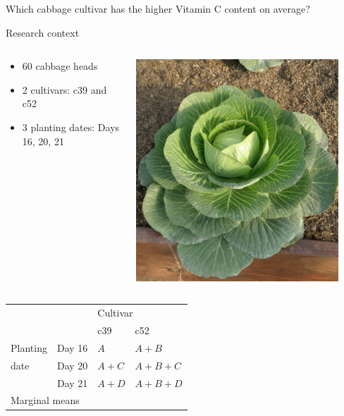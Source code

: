 \documentclass[10pt]{beamer}
\begin{document}
\begin{frame}{Which cabbage cultivar has the higher Vitamin C content on average?}
 \begin{block}{Research context}
 \begin{columns}
  \begin{column}{0.8\textwidth}
   \begin{itemize}
    \item 60 cabbage heads
    \item 2 cultivars: c39 and c52
    \item 3 planting dates: Days 16, 20, 21
   \end{itemize}
  \end{column}
  \begin{column}{0.2\textwidth}
    \includegraphics[width=0.9\textwidth]{Figures/cabbage}
  \end{column}

 \end{columns}
 \end{block}

 
 \pause
 
 \begin{center}
\begin{tabular}{|l | l | l | l | }
\toprule
  \multicolumn{2}{|l|}{} & \multicolumn{2}{l|}{Cultivar}\\
  \cmidrule(lr){3-4}
  \multicolumn{2}{|l|}{}  & c39 & c52\\
 	    \midrule
      Planting& Day 16 & $A$ & $A+B$\\
 	 date   & Day 20 & $A+C$ & $A+B+C$\\
		& Day 21 & $A+D$ & $A+B+D$\\
		\midrule
\multicolumn{2}{|l|}{Marginal means} &  & \\	
	    \bottomrule
  \end{tabular}
\end{center}
 
\end{frame}
\end{document}
